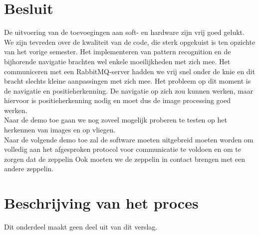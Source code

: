 \documentclass[tt]{penoverslag}
\begin{document}
\section{Besluit}
De uitvoering van de toevoegingen aan soft- en hardware zijn vrij goed gelukt. We zijn tevreden over de kwaliteit van de code, die sterk opgekuist is ten opzichte van het vorige semester. Het implementeren van pattern recognition en de bijhorende navigatie brachten wel enkele moeilijkheden met zich mee. Het communiceren met een RabbitMQ-server hadden we vrij snel onder de knie en dit bracht slechts kleine aanpassingen met zich mee. Het probleem op dit moment is de navigatie en positieherkenning. De navigatie op zich zou kunnen werken, maar hiervoor is positieherkenning nodig en moet dus de image processing goed werken. \\
Naar de demo toe gaan we nog zoveel mogelijk proberen te testen op het herkennen van images en op vliegen. \\
Naar de volgende demo toe zal de software moeten uitgebreid moeten worden om volledig aan het afgesproken protocol voor communicatie te voldoen en om te zorgen dat de zeppelin Ook moeten we de zeppelin in contact brengen met een andere zeppelin. \\

\newpage\makeappendix

\section{Beschrijving van het proces}
Dit onderdeel maakt geen deel uit van dit verslag.
\end{document}
